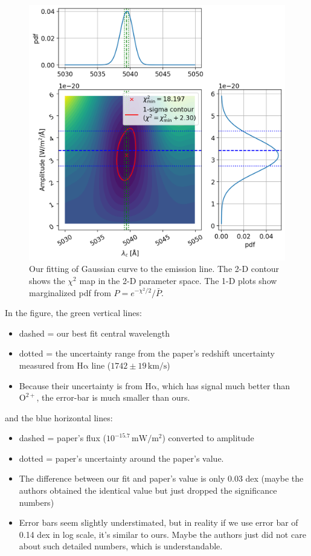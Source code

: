 \begin{figure}[ht!]
  \centering
  \includegraphics[width=0.7\linewidth]{figs/Greco2018-fit}
  \caption{Our fitting of Gaussian curve to the emission line. The 2-D contour shows the $ \chi^2 $ map in the 2-D parameter space. The 1-D plots show marginalized pdf from $ P = e^{-\chi^2/2} / \bar{P} $.}
  \label{fig:greco2018-fit}
\end{figure}

In the figure, the green vertical lines:
\begin{itemize}
  \item dashed = our best fit central wavelength
  \item dotted = the uncertainty range from the paper's redshift uncertainty measured from $ \mathrm{H\alpha} $ line ($ 1742 \pm 19 \,\mathrm{km/s} $)
  \item Because their uncertainty is from $ \mathrm{H\alpha} $, which has signal much better than $ \mathrm{O^{2+}} $, the error-bar is much smaller than ours.
\end{itemize}
and the blue horizontal lines:
\begin{itemize}
\item dashed = paper's flux ($ 10^{-15.7} \,\mathrm{mW/m^2} $) converted to amplitude
\item dotted = paper's uncertainty around the paper's value.
\item The difference between our fit and paper's value is only 0.03 dex (maybe the authors obtained the identical value but just dropped the significance numbers)
\item Error bars seem slightly understimated, but in reality if we use error bar of 0.14 dex in log scale, it's similar to ours. Maybe the authors just did not care about such detailed numbers, which is understandable.
\end{itemize}

